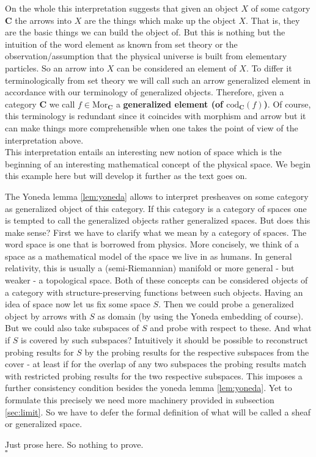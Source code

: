 On the whole this interpretation suggests that given an object $X$ of some catgory $\mathbf{C}$ the arrows into $X$ are the things which make up the object $X$. That is, they are the basic things we can build the object of. But this is nothing but the intuition of the word {\glqq}element{\grqq} as known from set theory or the observation/assumption that the physical universe is built from elementary particles. So an arrow into $X$ can be considered an element of $X$. To differ it terminologically from set theory we will call such an arrow generalized element in accordance with our terminology of generalized objects. Therefore, given a category $\mathbf{C}$ we call $f \in \mathrm{Mor}_{\mathbf{C}}$ a \textbf{generalized element (of $\mathrm{cod}_{\mathbf{C}}(f)$)}. Of course, this terminology is redundant since it coincides with morphism and arrow but it can make things more comprehensible when one takes the point of view of the interpretation above.
\\
This interpretation entails an interesting new notion of {\glqq}space{\grqq} which is the beginning of an interesting mathematical concept of the physical space. We begin this example here but will develop it further as the text goes on.
\\
\begin{exa}
\label{exa:gs1}
The Yoneda lemma \ref{lem:yoneda} allows to interpret presheaves on some category as generalized object of this category. If this category is a category of spaces one is tempted to call the generalized objects rather generalized spaces. But does this make sense? First we have to clarify what we mean by a category of spaces. The word {\glqq}space{\grqq} is one that is borrowed from physics. More concisely, we think of a space as a mathematical model of the space we live in as humans. In general relativity, this is usually a {\glqq}(semi-Riemannian) manifold{\grqq} or more general - but weaker - a topological space. Both of these concepts can be considered objects of a category with {\glqq}structure-preserving{\grqq} functions between such objects. Having an idea of space now let us fix some space $S$. Then we could probe a generalized object by arrows with $S$ as domain (by using the Yoneda embedding of course). But we could also take subspaces of $S$ and probe with respect to these. And what if $S$ is covered by such subspaces? Intuitively it should be possible to reconstruct probing results for $S$ by the probing results for the respective subspaces from the cover - at least if for the overlap of any two subspaces the probing results match with restricted probing results for the two respective subspaces. This imposes a further consistency condition besides the yoneda lemma \ref{lem:yoneda}. Yet to formulate this precisely we need more machinery provided in subsection \ref{sec:limit}. So we have to defer the formal definition of what will be called a {\glqq}sheaf{\grqq} or generalized space.
\end{exa}
\begin{prf}
Just prose here. So nothing to prove.
\\
\phantom{proven}
\hfill
$\square$
\end{prf}
